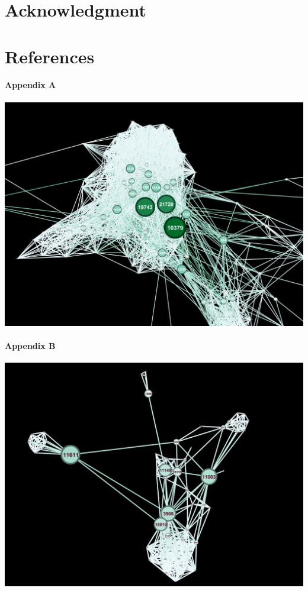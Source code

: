 \documentclass[11pt,twocolumn]{article}
\begin{document}
\section{Acknowledgment}
\section{References}
 



\appendixpage
\paragraph{Appendix A\newline\newline}
\includegraphics[scale=0.22]{betweennesscentraility_gov.png}
\paragraph{Appendix B\newline\newline}
\includegraphics[scale=0.22]{betweennesscentraility_politician.png}
\newline
\end{document}
